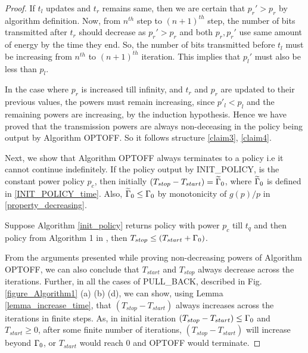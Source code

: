 \begin{proof}
If $t_l$ updates and $t_r$ remains same, then we are certain that $p_{r}'>p_r$ by algorithm definition. Now, from $n^{th}$ step to $(n+1)^{th}$ step, the number of bits transmitted after $t_r$ should decrease as $p_{r}'>p_r$ and both $p_r,p_r'$ use same amount of energy by the time they end. So, the number of bits transmitted before $t_l$ must be increasing from $n^{th}$ to $(n+1)^{th}$ iteration. This implies that $p_l'$ must also be less than $p_l$.

In the case where $p_r$ is increased till infinity, and $t_r$ and $p_r$ are updated to their previous values, the powers must remain increasing, since $p'_l <p_l$ and the remaining powers are increasing, by the induction hypothesis. Hence we have proved that the transmission powers are always non-deceasing in the policy being output by Algorithm OPTOFF. So it follows structure \eqref{claim3}, \eqref{claim4}.


Next, we show that Algorithm OPTOFF always terminates to a policy i.e it cannot continue indefinitely. If the policy output by INIT\_POLICY, is the constant power policy $p_c$, then initially $(T_{stop}-T_{start})=\widetilde{\Gamma}_0$, where $\widetilde{\Gamma}_0$ is defined in \eqref{INIT_POLICY_time}. Also, $\widetilde{\Gamma}_0\le \Gamma_0$ by monotonicity of $g(p)/p$ in \eqref{property_decreasing}.

Suppose Algorithm \ref{init_policy} returns policy with power $p_c$ till $t_q$ and then policy from Algorithm 1 in  \cite{Yang}, then $T_{stop}\le (T_{start}+ \Gamma_0)$. 

From the arguments presented while proving non-decreasing powers of Algorithm OPTOFF, we can also conclude that $T_{start}$ and $T_{stop}$ always decrease across the iterations. Further, in all the cases of PULL\_BACK, described in Fig. \ref{figure_Algorithm1} (a) (b) (d), we can show, using Lemma \ref{lemma_increase_time}, that $(T_{stop}-T_{start})$ always increases across the iterations in finite steps. As, in initial iteration $(T_{stop}-T_{start})\le \Gamma_0$ and $T_{start}\ge 0$, after some finite number of iterations, $(T_{stop}-T_{start})$ will increase beyond $\Gamma_0$, or $T_{start}$ would reach 0 and OPTOFF would terminate.


\end{proof}
